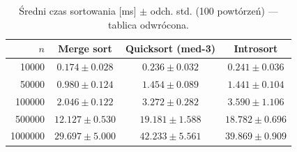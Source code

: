\begin{table}[H]
\centering
\caption{Średni czas sortowania [ms] $\pm$ odch. std. (100 powtórzeń) — tablica odwrócona.}
\label{tab:summary_reverse}
\begin{tabular}{rccc}
\toprule
$n$ & Merge sort & Quicksort (med-3) & Introsort \\
\midrule
\num{10000} & $0.174 \pm 0.028$ & $0.236 \pm 0.032$ & $0.241 \pm 0.036$ \\
\num{50000} & $0.980 \pm 0.124$ & $1.454 \pm 0.089$ & $1.441 \pm 0.104$ \\
\num{100000} & $2.046 \pm 0.122$ & $3.272 \pm 0.282$ & $3.590 \pm 1.106$ \\
\num{500000} & $12.127 \pm 0.530$ & $19.181 \pm 1.588$ & $18.782 \pm 0.696$ \\
\num{1000000} & $29.697 \pm 5.000$ & $42.233 \pm 5.561$ & $39.869 \pm 0.909$ \\
\bottomrule
\end{tabular}
\end{table}
